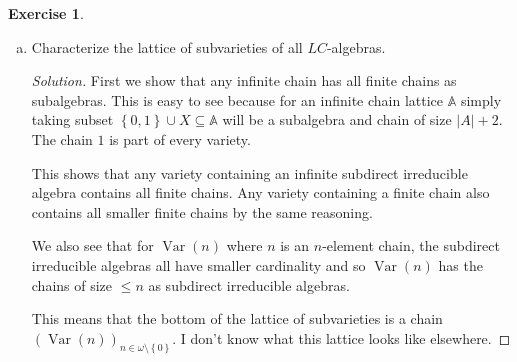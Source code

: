 \documentclass{article}
\newcommand{\set}[1]{\left\{#1\right\}}
\renewcommand{\qedsymbol}{\raisebox{-0.5cm}{}}
\DeclareMathOperator{\var}{Var}
\newenvironment{solution}{\begin{proof}[Solution]\renewcommand\qedsymbol{}}{\end{proof}}
\theoremstyle{definition}
\newtheorem{question}{Exercise}
\begin{document}
\begin{question}
\begin{enumerate}[a)]
        \item Characterize the lattice of subvarieties of all \(LC\)-algebras.

              \begin{solution}
                  First we show that any infinite chain has all finite chains as
                  subalgebras. This is easy to see because for an infinite chain
                  lattice \(\mathbb{A}\) simply taking subset \(\set{0,1}\cup
                  X\subseteq\mathbb{A}\) will be a subalgebra and chain of size
                  \(|A|+2\). The chain \(1\) is part of every variety.

                  This shows that any variety containing an infinite subdirect
                  irreducible algebra contains all finite chains. Any variety
                  containing a finite chain also contains all smaller finite
                  chains by the same reasoning.

                  We also see that for \(\var(n)\) where \(n\) is an
                  \(n\)-element chain, the subdirect irreducible algebras all
                  have smaller cardinality and so \(\var(n)\) has the chains of
                  size \(\leq n\) as subdirect irreducible algebras.

                  This means that the bottom of the lattice of subvarieties is a
                  chain \((\var(n))_{n\in\omega\setminus\set{0}}\). I don't know
                  what this lattice looks like elsewhere.
              \end{solution}
    \end{enumerate}
\end{question}
\end{document}
